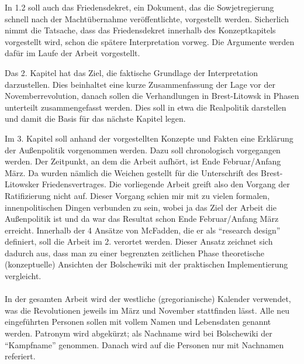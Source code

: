\documentclass{../../sem_paper}
\begin{document}
In 1.2 soll auch das Friedensdekret, ein Dokument, das die Sowjetregierung schnell nach der Machtübernahme veröffentlichte, vorgestellt werden. Sicherlich nimmt die Tatsache, dass das Friedensdekret innerhalb des Konzeptkapitels vorgestellt wird, schon die spätere Interpretation vorweg. Die Argumente werden dafür im Laufe der Arbeit vorgestellt.

Das 2. Kapitel hat das Ziel, die faktische Grundlage der Interpretation darzustellen. Dies beinhaltet eine kurze Zusammenfassung der Lage vor der Novemberrevolution, danach sollen die Verhandlungen in Brest-Litowsk in Phasen unterteilt zusammengefasst werden. Dies soll in etwa die Realpolitik darstellen und damit die Basis für das nächste Kapitel legen. 

Im 3. Kapitel soll anhand der vorgestellten Konzepte und Fakten eine Erklärung der Außenpolitik vorgenommen werden. Dazu soll chronologisch vorgegangen werden. Der Zeitpunkt, an dem die Arbeit aufhört, ist Ende Februar/Anfang März. Da wurden nämlich die Weichen gestellt für die Unterschrift des Brest-Litowsker Friedensvertrages. Die vorliegende Arbeit greift also den Vorgang der Ratifizierung nicht auf. Dieser Vorgang schien mir mit zu vielen formalen, innenpolitischen Dingen verbunden zu sein, wobei ja das Ziel der Arbeit die Außenpolitik ist und da war das Resultat schon Ende Februar/Anfang März erreicht.
Innerhalb der 4 Ansätze von McFadden\autocite{fadden1993}, die er als "`research design"' definiert, soll die Arbeit im 2. verortet werden. Dieser Ansatz zeichnet sich dadurch aus, dass man zu einer  begrenzten zeitlichen Phase theoretische (konzeptuelle) Ansichten der Bolschewiki mit der praktischen Implementierung vergleicht. 
\\\\
In der gesamten Arbeit wird der westliche (gregorianische) Kalender  verwendet, was die Revolutionen jeweils im März und November stattfinden lässt. Alle neu eingeführten Personen sollen mit vollem Namen und Lebensdaten genannt werden. Patronym wird abgekürzt; als Nachname wird bei Bolschewiki der "`Kampfname"' genommen. Danach wird auf die Personen nur mit Nachnamen referiert.

\end{document}
